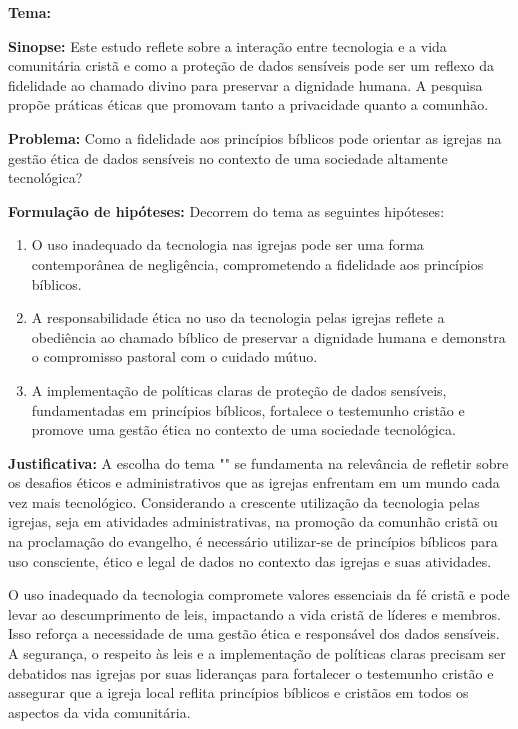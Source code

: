 \documentclass[12pt,a4paper]{article}
\begin{document}
\hypersetup{pageanchor=false}  %





\newpage
\pagestyle{plain}
\renewcommand{\baselinestretch}{1.5}
\normalsize
\noindent
\textbf{Tema:} \tema

\noindent
\textbf{Sinopse:} Este estudo reflete sobre a interação entre tecnologia e a vida comunitária cristã e como a proteção de dados sensíveis pode ser um reflexo da fidelidade ao chamado divino para preservar a dignidade humana. A pesquisa propõe práticas éticas que promovam tanto a privacidade quanto a comunhão.

\noindent
\textbf{Problema:} Como a fidelidade aos princípios bíblicos pode orientar as igrejas na gestão ética de dados sensíveis no contexto de uma sociedade altamente tecnológica?

\noindent
\textbf{Formulação de hipóteses:}
Decorrem do tema as seguintes hipóteses:
\begin{enumerate}
    \item O uso inadequado da tecnologia nas igrejas pode ser uma forma contemporânea de negligência, comprometendo a fidelidade aos princípios bíblicos.
    \item A responsabilidade ética no uso da tecnologia pelas igrejas reflete a obediência ao chamado bíblico de preservar a dignidade humana e demonstra o compromisso pastoral com o cuidado mútuo.
    \item A implementação de políticas claras de proteção de dados sensíveis, fundamentadas em princípios bíblicos, fortalece o testemunho cristão e promove uma gestão ética no contexto de uma sociedade tecnológica.
\end{enumerate}

\noindent
\textbf{Justificativa:} A escolha do tema "\tema" se fundamenta na relevância de refletir sobre os desafios éticos e administrativos que as igrejas enfrentam em um mundo cada vez mais tecnológico. Considerando a crescente utilização da tecnologia pelas igrejas, seja em atividades administrativas, na promoção da comunhão cristã ou na proclamação do evangelho, é necessário utilizar-se de princípios bíblicos para uso consciente, ético e legal de dados no contexto das igrejas e suas atividades.

O uso inadequado da tecnologia compromete valores essenciais da fé cristã e pode levar ao descumprimento de leis, impactando a vida cristã de líderes e membros. Isso reforça a necessidade de uma gestão ética e responsável dos dados sensíveis. A segurança, o respeito às leis e a implementação de políticas claras precisam ser debatidos nas igrejas por suas lideranças para fortalecer o testemunho cristão e assegurar que a igreja local reflita princípios bíblicos e cristãos em todos os aspectos da vida comunitária.
\end{document}
